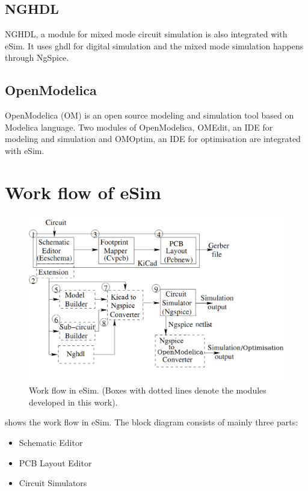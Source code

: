 \subsection{NGHDL}  \label{sec:nghdl}
NGHDL, a module for mixed mode circuit simulation is also integrated with eSim. 
It uses ghdl for digital simulation and the mixed mode simulation happens through 
NgSpice.

\subsection{OpenModelica}  \label{sec:openmodelica}
OpenModelica (OM) is an open source modeling and simulation tool based on
Modelica language. Two modules of OpenModelica, OMEdit, an IDE for modeling 
and simulation and OMOptim, an IDE for optimisation are integrated with eSim.

\section {Work flow of eSim}

\begin{figure}
\centering
\includegraphics[width=\hgfig]
{blockdiagram.png}
\caption{Work flow in eSim. (Boxes with dotted lines denote
  the modules developed in this work).}
\label{blockd}
\end{figure}

 shows the work flow in eSim. The block diagram consists of mainly three parts: 
\begin{itemize}
\item Schematic Editor 
\item PCB Layout Editor  
\item Circuit Simulators
\end{itemize} 



